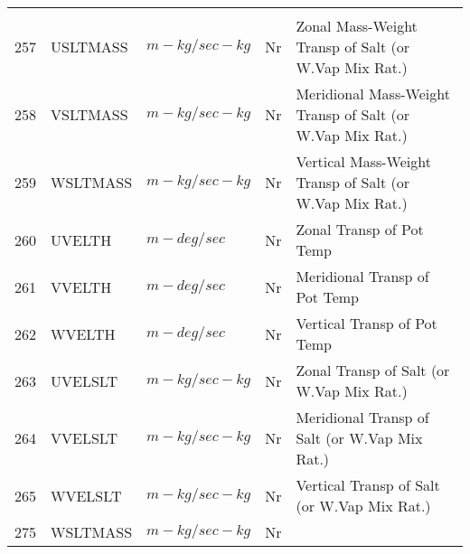 \begin{tabular}{lllll}
\begin{minipage}[t]{3in}
         \end{minipage}\\
257& USLTMASS & $m-kg/sec-kg$ & Nr
         &\begin{minipage}[t]{3in}
          {Zonal Mass-Weight Transp of Salt (or W.Vap Mix Rat.)} 
         \end{minipage}\\
258& VSLTMASS & $m-kg/sec-kg$ & Nr
         &\begin{minipage}[t]{3in}
          {Meridional Mass-Weight Transp of Salt (or W.Vap Mix Rat.)} 
         \end{minipage}\\
259& WSLTMASS & $m-kg/sec-kg$ & Nr
         &\begin{minipage}[t]{3in}
          {Vertical Mass-Weight Transp of Salt (or W.Vap Mix Rat.)} 
         \end{minipage}\\
260& UVELTH   & $m-deg/sec$ & Nr
         &\begin{minipage}[t]{3in}
          {Zonal Transp of Pot Temp} 
         \end{minipage}\\
261& VVELTH   & $m-deg/sec$ & Nr
         &\begin{minipage}[t]{3in}
          {Meridional Transp of Pot Temp} 
         \end{minipage}\\
262& WVELTH   & $m-deg/sec$ & Nr
         &\begin{minipage}[t]{3in}
          {Vertical Transp of Pot Temp} 
         \end{minipage}\\
263& UVELSLT  & $m-kg/sec-kg$ & Nr
         &\begin{minipage}[t]{3in}
          {Zonal Transp of Salt (or W.Vap Mix Rat.)} 
         \end{minipage}\\
264& VVELSLT  & $m-kg/sec-kg$ & Nr
         &\begin{minipage}[t]{3in}
          {Meridional Transp of Salt (or W.Vap Mix Rat.)} 
         \end{minipage}\\
265& WVELSLT  & $m-kg/sec-kg$ & Nr
         &\begin{minipage}[t]{3in}
          {Vertical Transp of Salt (or W.Vap Mix Rat.)} 
         \end{minipage}\\
275& WSLTMASS & $m-kg/sec-kg$ & Nr
         &\begin{minipage}[t]{3in}

\end{minipage}
\end{tabular}
